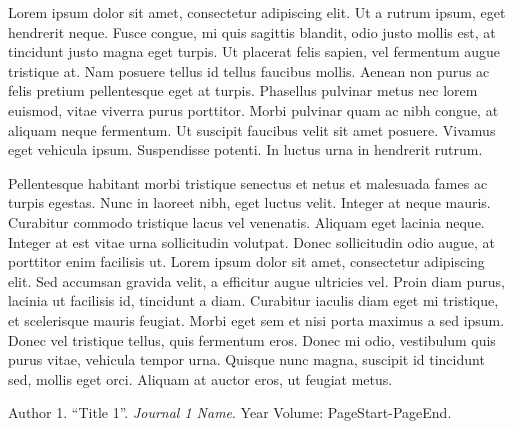 \documentclass[10pt]{article}
\begin{document}
Lorem ipsum dolor sit amet, consectetur adipiscing elit. Ut a rutrum ipsum, eget hendrerit neque. Fusce congue, mi quis sagittis blandit, odio justo mollis est, at tincidunt justo magna eget turpis. Ut placerat felis sapien, vel fermentum augue tristique at. Nam posuere tellus id tellus faucibus mollis. Aenean non purus ac felis pretium pellentesque eget at turpis. Phasellus pulvinar metus nec lorem euismod, vitae viverra purus porttitor. Morbi pulvinar quam ac nibh congue, at aliquam neque fermentum. Ut suscipit faucibus velit sit amet posuere. Vivamus eget vehicula ipsum. Suspendisse potenti. In luctus urna in hendrerit rutrum. \medskip

\smallskip

Pellentesque habitant morbi tristique senectus et netus et malesuada fames ac turpis egestas. Nunc in laoreet nibh, eget luctus velit. Integer at neque mauris. Curabitur commodo tristique lacus vel venenatis. Aliquam eget lacinia neque. Integer at est vitae urna sollicitudin volutpat. Donec sollicitudin odio augue, at porttitor enim facilisis ut. Lorem ipsum dolor sit amet, consectetur adipiscing elit. Sed accumsan gravida velit, a efficitur augue ultricies vel. Proin diam purus, lacinia ut facilisis id, tincidunt a diam. Curabitur iaculis diam eget mi tristique, et scelerisque mauris feugiat. Morbi eget sem et nisi porta maximus a sed ipsum. Donec vel tristique tellus, quis fermentum eros. Donec mi odio, vestibulum quis purus vitae, vehicula tempor urna. Quisque nunc magna, suscipit id tincidunt sed, mollis eget orci. Aliquam at auctor eros, ut feugiat metus.\medskip

{\small\begin{thebibliography}{2}    
    Author 1.
    ``Title 1''.
    \textit{Journal 1 Name}.
    Year Volume: PageStart-PageEnd.
\end{thebibliography}}
\end{document}
